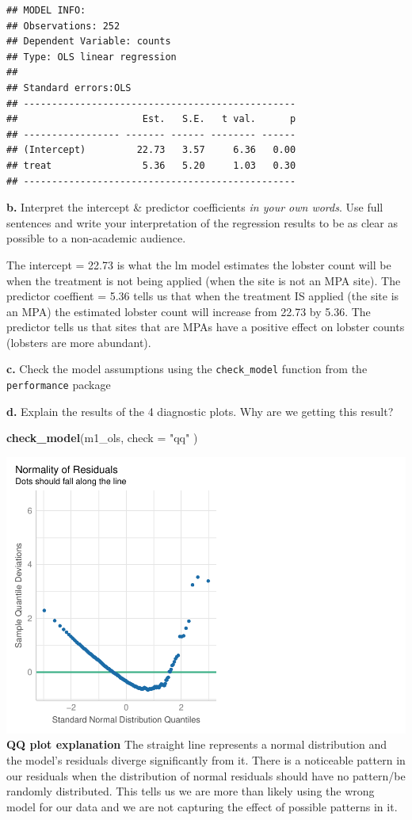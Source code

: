 \documentclass[
]{article}
\newenvironment{Shaded}{\begin{snugshade}}{\end{snugshade}}
\newcommand{\AttributeTok}[1]{\textcolor[rgb]{0.13,0.29,0.53}{#1}}
\newcommand{\FunctionTok}[1]{\textcolor[rgb]{0.13,0.29,0.53}{\textbf{#1}}}
\newcommand{\NormalTok}[1]{#1}
\newcommand{\StringTok}[1]{\textcolor[rgb]{0.31,0.60,0.02}{#1}}
\begin{document}
\begin{verbatim}
## MODEL INFO:
## Observations: 252
## Dependent Variable: counts
## Type: OLS linear regression 
## 
## Standard errors:OLS
## ------------------------------------------------
##                      Est.   S.E.   t val.      p
## ----------------- ------- ------ -------- ------
## (Intercept)         22.73   3.57     6.36   0.00
## treat                5.36   5.20     1.03   0.30
## ------------------------------------------------
\end{verbatim}

\textbf{b.} Interpret the intercept \& predictor coefficients \emph{in
your own words}. Use full sentences and write your interpretation of the
regression results to be as clear as possible to a non-academic
audience.

The intercept = 22.73 is what the lm model estimates the lobster count
will be when the treatment is not being applied (when the site is not an
MPA site). The predictor coeffient = 5.36 tells us that when the
treatment IS applied (the site is an MPA) the estimated lobster count
will increase from 22.73 by 5.36. The predictor tells us that sites that
are MPAs have a positive effect on lobster counts (lobsters are more
abundant).

\textbf{c.} Check the model assumptions using the \texttt{check\_model}
function from the \texttt{performance} package

\textbf{d.} Explain the results of the 4 diagnostic plots. Why are we
getting this result?

\begin{Shaded}
\begin{Highlighting}[]
\FunctionTok{check\_model}\NormalTok{(m1\_ols, }\AttributeTok{check =} \StringTok{"qq"}\NormalTok{ )}
\end{Highlighting}
\end{Shaded}

\includegraphics{hw1-lobstrs-eds241_files/figure-latex/unnamed-chunk-14-1.pdf}
\textbf{QQ plot explanation} The straight line represents a normal
distribution and the model's residuals diverge significantly from it.
There is a noticeable pattern in our residuals when the distribution of
normal residuals should have no pattern/be randomly distributed. This
tells us we are more than likely using the wrong model for our data and
we are not capturing the effect of possible patterns in it.
\end{document}
